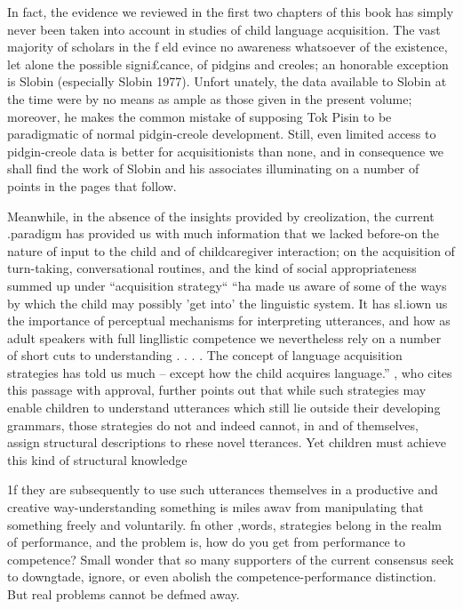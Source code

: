 In fact, the evidence we reviewed in the first two chapters of this book has simply never been taken into account in studies of child language acquisition. The vast majority of scholars in the f eld evince no awareness whatsoever of the existence, let alone the possible signi£cance, of pidgins and creoles; an honorable exception is Slobin (especially Slobin 1977). Unfort unately, the data available to Slobin at the time were by no means as ample as those given in the present volume; moreover, he makes the common mistake of supposing Tok Pisin to be paradigmatic of normal pidgin-creole development. Still, even limited access to pidgin-creole data is better for acquisitionists than none, and in consequence we shall find the work of Slobin and his associates illuminating on a number of points in the pages that
follow.

Meanwhile, in the absence of the insights provided by creolization, the current .paradigm has provided us with much information that we lacked before-on the nature of input to the child and of child\-caregiver interaction; on the acquisition of turn-taking, conversational routines, and the kind of social appropriateness summed up under
``acquisition strategy`` ``ha made us aware of some of the ways by which the child may possibly 'get into' the linguistic system. It has sl.iown us the importance of perceptual mechanisms for interpreting utterances, and how as adult speakers with full lingllistic competence we nevertheless rely on a number of short cuts to understanding . . . . The concept of language acquisition strategies has told us much -- except how the child acquires language.'' \citet{Bowerman1979} , who cites this passage with approval, further points out that while such strategies may enable children to understand utterances which still lie outside their developing grammars, those strategies do not and indeed cannot, in and of themselves, assign structural descriptions to rhese novel tterances. Yet children must achieve this kind of structural knowledge

1f they are subsequently to use such utterances themselves in a produc\-tive and creative way-understanding something is miles awav from manipulating that something freely and voluntarily. fn other ,words, strategies belong in the realm of performance, and the problem is, how do you get from performance to competence? Small wonder that so many supporters of the current consensus seek to downgtade, ignore,
or even abolish the competence-performance distinction. But real problems cannot be defmed away.


